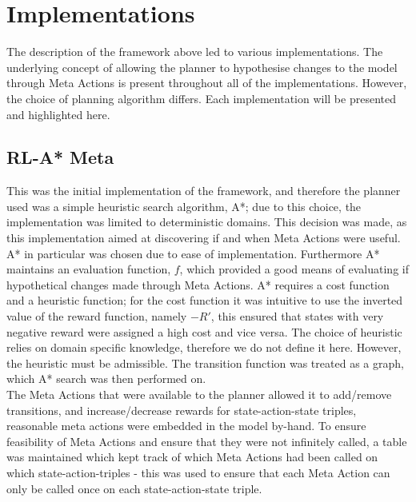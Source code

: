 \section{Implementations}
The description of the framework above led to various implementations. The underlying concept of allowing the planner to hypothesise changes to the model through Meta Actions is present throughout all of the implementations. However, the choice of planning algorithm differs. Each implementation will be presented and highlighted here.
\subsection{RL-A* Meta}
This was the initial implementation of the framework, and therefore the planner used was a simple heuristic search algorithm, A*; due to this choice, the implementation was limited to deterministic domains. This decision was made, as this implementation aimed at discovering if and when Meta Actions were useful. A* in particular was chosen due to ease of implementation. Furthermore A* maintains an evaluation function, $f$, which provided a good means of evaluating if hypothetical changes made through Meta Actions. A* requires a cost function and a heuristic function; for the cost function it was intuitive to use the inverted value of the reward function, namely $-R'$, this ensured that states with very negative reward were assigned a high cost and vice versa. The choice of heuristic relies on domain specific knowledge, therefore we do not define it here. However, the heuristic must be admissible. The transition function was treated as a graph, which A* search was then performed on.
\\The Meta Actions that were available to the planner allowed it to add/remove transitions, and increase/decrease rewards for state-action-state triples, reasonable meta actions were embedded in the model by-hand. To ensure feasibility of Meta Actions and ensure that they were not infinitely called, a table was maintained which kept track of which Meta Actions had been called on which state-action-triples - this was used to ensure that each Meta Action can only be called once on each state-action-state triple.

